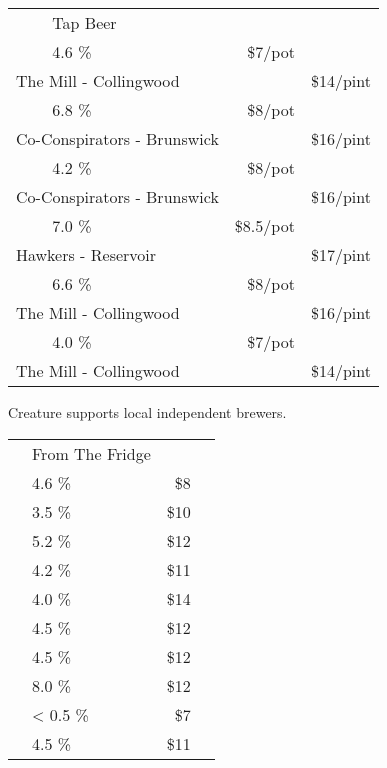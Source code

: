 \documentclass[12pt]{article}
\makeatletter
\newcommand*\ColText[1]{\textcolor{SpringGreen4}{#1}}
\newcommand*\GroupGlassTitle[2]{%
  \noalign{\vspace{2em}}
  \fontfamily{qzc}\selectfont #2 & \vspace{1em}\fontsize{20}{29}\selectfont\ColText{#1}}
\newenvironment{Group}
  {\vspace{2em}\noindent\begin{tabular*}{\textwidth}{@{} p{10mm} l@{\extracolsep{\fill}} r@{\hspace{1em}} r@{}}} %
  {\end{tabular*}}
\newcommand*\Booze[3]{%
  \noalign{\vspace{1em}}
  \multicolumn{2}{l}{ #1 \tiny\dotfill } & \scriptsize #2 \% \tiny\dotfill & \normalsize \$#3}
\newcommand*\Beer[5]{%
  \noalign{\vspace{2em}}
  \Booze{#1}{#3}{#4\tiny/pot} \\
  \multicolumn{2}{l}{ \hspace*{0.1em} \scriptsize #2 } & {} & \normalsize \$#5\tiny/pint}
\newcommand*\Glass[2]{%
    \begin{tikzpicture}[remember picture,overlay]
        \node[xshift=5mm,yshift=0mm]{%
            \texttt{[image: Glasses/\#1.png]}
        };
    \end{tikzpicture}%
}
\newcommand*\GlassWeizen{%
    \Glass{weizen}{4mm}}
\newcommand*\GlassFridge{%
    \Glass{fridge}{7.5mm}}
\makeatother
\begin{document}
%


\begin{Group}
    \GroupGlassTitle{Tap Beer}{\GlassWeizen} \\
    \Beer{Daydream \textbf{Session Ale}}{The Mill - Collingwood}{4.6}{7}{14} \\
    \Beer{The Renegade \textbf{WC IPA}}{Co-Conspirators - Brunswick}{6.8}{8}{16} \\
    \Beer{The Wheelman \textbf{Raspberry Gose}}{Co-Conspirators - Brunswick}{4.2}{8}{16} \\
    \Beer{Beneath the Trees, We Gather \textbf{Yuzu \& Plum Sour}}{Hawkers - Reservoir}{7.0}{8.5}{17} \\
    \Beer{The Dark Lord \textbf{Black IPA}}{The Mill - Collingwood}{6.6}{8}{16} \\
    \Beer{Cracking \textbf{Lager}}{The Mill - Collingwood}{4.0}{7}{14} \\
\end{Group}
\vfill
\begin{center}
	Creature supports local independent brewers.
\end{center}
\pagebreak
\begin{Group}
    \GroupGlassTitle{From The Fridge}{\GlassFridge} \\
    \Booze{Melbourne Bitter}{4.6}{8} \\
    \Booze{Bodriggy Speccy Juice \textbf{Hazy Session IPA}}{3.5}{10} \\
    \Booze{Stomping Ground \textbf{Pale Ale}}{5.2}{12} \\
    \Booze{Stomping Ground \textbf{Passionfruit Smash Sour}}{4.2}{11} \\
    \Booze{Lick Pier \textbf{Alcoholic Ginger Beer}}{4.0}{14} \\
    \Booze{Sopra Sicilian \textbf{Blood Orange Seltzer}}{4.5}{12} \\
    \Booze{Sopra Sicilian \textbf{Limoncello Seltzer}}{4.5}{12} \\
    \Booze{Sopra Super Potente \textbf{Pomegranate Power Seltzer}}{8.0}{12} \\
    \Booze{Hop Nation Mind Ya Head \textbf{Non Alcoholic XPA}}{< 0.5}{7} \\
    \Booze{Napoleone \& Co Louis \textbf{Hard Cider}}{4.5}{11} \\
\end{Group}
\end{document}
